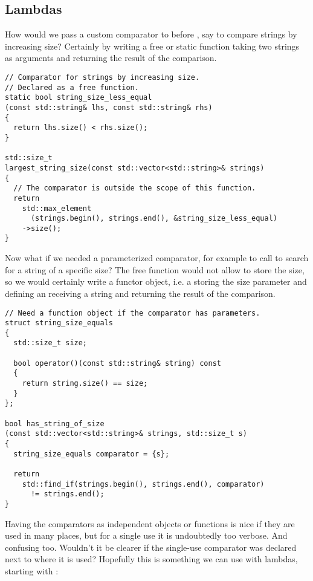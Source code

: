 \subsection{Lambdas}
\label{sec:lambda}

How would we pass a custom comparator to 
before , say to compare strings by increasing size? Certainly by
writing a free or static function taking two strings as arguments and
returning the result of the comparison.

\begin{lstlisting}
// Comparator for strings by increasing size.
// Declared as a free function.
static bool string_size_less_equal
(const std::string& lhs, const std::string& rhs)
{
  return lhs.size() < rhs.size();
}

std::size_t
largest_string_size(const std::vector<std::string>& strings)
{
  // The comparator is outside the scope of this function.
  return
    std::max_element
      (strings.begin(), strings.end(), &string_size_less_equal)
    ->size();
}
\end{lstlisting}

Now what if we needed a parameterized comparator, for example to call
 to search for a string of a specific size? The
free function would not allow to store the size, so we would
certainly write a functor object, i.e. a  storing the
size parameter and defining an  receiving a string
and returning the result of the comparison.

\begin{lstlisting}
// Need a function object if the comparator has parameters.
struct string_size_equals
{
  std::size_t size;

  bool operator()(const std::string& string) const
  {
    return string.size() == size;
  }
};

bool has_string_of_size
(const std::vector<std::string>& strings, std::size_t s)
{
  string_size_equals comparator = {s};

  return
    std::find_if(strings.begin(), strings.end(), comparator)
      != strings.end();
}
\end{lstlisting}

Having the comparators as independent objects or functions is nice if
they are used in many places, but for a single use it is undoubtedly
too verbose. And confusing too. Wouldn't it be clearer if the
single-use comparator was declared next to where it is used?
Hopefully this is something we can use with lambdas, starting with
:

